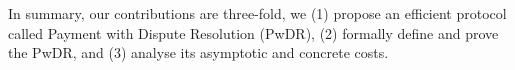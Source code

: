 In summary,  our contributions are three-fold, we (1) propose an efficient protocol called Payment with Dispute Resolution (PwDR), (2) formally define and prove the PwDR, and (3) analyse its asymptotic and concrete costs.     






% 
%
% 




